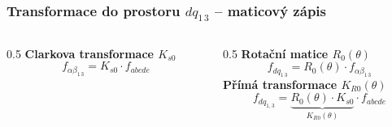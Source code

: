 \documentclass[%
  12pt,       				%
	t,                  %
	aspectratio=1610,   %
	unicode,						%
]{beamer}				    	%
\begin{document}
\begin{frame}
	\frametitle{Transformace do prostoru $dq_{1\,3}$ -- maticový zápis}
	\begin{columns}
		\begin{column}{0.5\textwidth}
			\textbf{Clarkova transformace $K_{s0}$}
			\[
				f_{\alpha \beta_{1\,3}} 
				= K_{s0} \cdot
				f_{abcde}
			\]
		\end{column}
		\begin{column}{0.5\textwidth}
			\textbf{Rotační matice $R_0(\theta)$}
			\[
				f_{dq_{1\,3}}
				= R_0(\theta) \cdot	f_{\alpha \beta_{1\,3}}
			\]
			\vspace{0.3em}
			\textbf{Přímá transformace $K_{R0}(\theta)$}
			\[
				f_{dq_{1,3}} = \underbrace{R_0(\theta)\cdot K_{s0}}_{K_{R0}(\theta)}\cdot f_{abcde}
			\]
		\end{column}
	\end{columns}
\end{frame}
\end{document}
